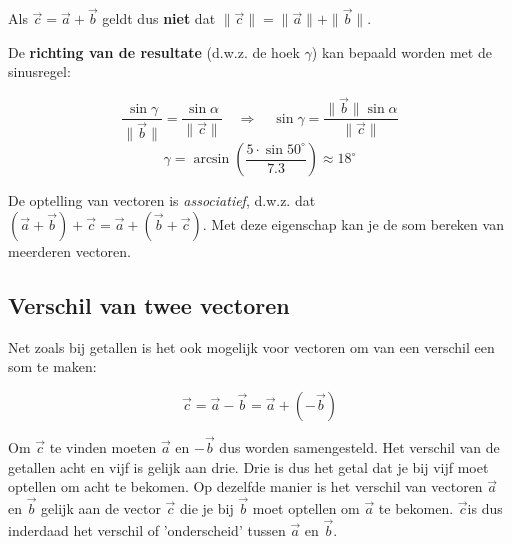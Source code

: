 \documentclass{ximera}
\begin{document}
\begin{remark}
Als \(\vec{c} = \vec{a} + \vec{b}\) geldt dus \textbf{niet} dat \(\|\vec{c}\| = \|\vec{a}\| + \|\vec{b}\|\).
\end{remark}


De \textbf{richting van de resultate} (d.w.z. de hoek \(\gamma\)) kan bepaald worden met de sinusregel: 

\[
\frac{\sin\gamma}{\|\vec{b}\|} = \frac{\sin\alpha}{\|\vec{c}\|}
\quad\Longrightarrow\quad
\sin\gamma = \frac{\|\vec{b}\|\sin\alpha}{\|\vec{c}\|}
\]
\[
\gamma = \arcsin\!\left(\frac{5\cdot\sin 50^\circ}{7.3}\right) \approx 18^\circ
\]





De optelling van vectoren is \textit{associatief}, d.w.z. dat \((\vec{a} + \vec{b}) + \vec{c} = \vec{a} + (\vec{b} + \vec{c})\). 
Met deze eigenschap kan je de som bereken van meerderen vectoren. 

\subsection*{Verschil van twee vectoren}

Net zoals bij getallen is het ook mogelijk voor vectoren om van een verschil een som te maken: 

\[
\vec{c} = \vec{a}-\vec{b} = \vec{a} + (-\vec{b})
\]

Om \(\vec{c}\) te vinden moeten \(\vec{a}\) en \(-\vec{b}\) dus worden samengesteld.
Het verschil van de getallen acht en vijf is gelijk aan drie. 
Drie is dus het getal dat je bij vijf moet optellen om acht te bekomen. 
Op dezelfde manier is het verschil van vectoren \(\vec{a}\) en \(\vec{b}\) gelijk aan de vector \(\vec{c}\) die je bij \(\vec{b}\) moet optellen om \(\vec{a}\) te bekomen.
 \(\vec{c}\)is dus inderdaad het verschil of 'onderscheid' tussen \(\vec{a}\) en \(\vec{b}\). 
\end{document}
